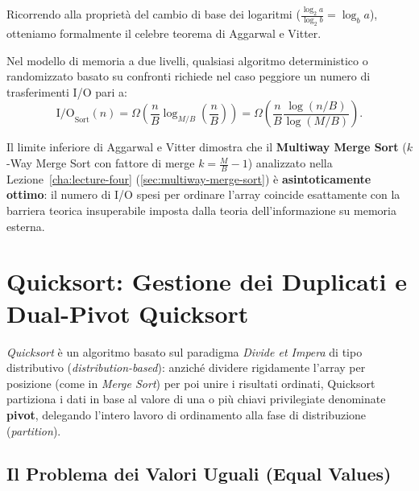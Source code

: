 Ricorrendo alla proprietà del cambio di base dei logaritmi ($\frac{\log_2 a}{\log_2 b} = \log_b a$), otteniamo formalmente il celebre teorema di Aggarwal e Vitter.

\begin{theorem}
\label{thm:aggarwal-vitter-bound}
Nel modello di memoria a due livelli, qualsiasi algoritmo deterministico o randomizzato basato su confronti richiede nel caso peggiore un numero di trasferimenti I/O pari a:
\begin{equation}
  \text{I/O}_{\text{Sort}}(n) = \Omega\left(\frac{n}{B} \log_{M/B}\left(\frac{n}{B}\right)\right) = \Omega\left(\frac{n}{B} \frac{\log(n / B)}{\log(M / B)}\right).
\end{equation}
\end{theorem}

\begin{property}
Il limite inferiore di Aggarwal e Vitter dimostra che il \textbf{Multiway Merge Sort} ($k$-Way Merge Sort con fattore di merge $k = \frac{M}{B} - 1$) analizzato nella Lezione~\ref{cha:lecture-four} (\autoref{sec:multiway-merge-sort}) è \textbf{asintoticamente ottimo}: il numero di I/O spesi per ordinare l'array coincide esattamente con la barriera teorica insuperabile imposta dalla teoria dell'informazione su memoria esterna.
\end{property}

\FloatBarrier
\section{Quicksort: Gestione dei Duplicati e Dual-Pivot Quicksort}
\label{sec:quicksort-and-dual-pivot}

\textit{Quicksort} è un algoritmo basato sul paradigma \textit{Divide et Impera} di tipo distributivo (\textit{distribution-based}): anziché dividere rigidamente l'array per posizione (come in \textit{Merge Sort}) per poi unire i risultati ordinati, Quicksort partiziona i dati in base al valore di una o più chiavi privilegiate denominate \textbf{pivot}, delegando l'intero lavoro di ordinamento alla fase di distribuzione (\textit{partition}).

\subsection{Il Problema dei Valori Uguali (Equal Values)}
\label{subsec:equal-values-problem}

